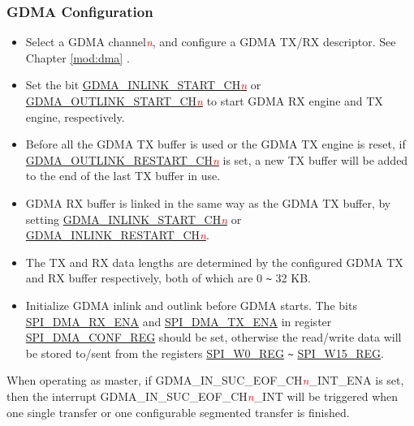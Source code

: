 \documentclass[main\_\_EN.tex]{subfiles}
\begin{document}
\subsubsection{GDMA Configuration}\label{para:gdma-config}


\begin{itemize}
    \item Select a GDMA channel\textcolor{red}{\it{n}}, and configure a GDMA TX/RX descriptor. See Chapter \ref{mod:dma} \textit{}.

    \item Set the bit \hyperref[fielddesc:GDMAINLINKSTARTCHN]{GDMA\_INLINK\_START\_CH\textcolor{red}{\it{n}}} or \hyperref[fielddesc:GDMAOUTLINKSTARTCHN]{GDMA\_OUTLINK\_START\_CH\textcolor{red}{\it{n}}} to start GDMA RX engine and TX engine, respectively.

    \item Before all the GDMA TX buffer is used or the GDMA TX engine is reset, if  \hyperref[fielddesc:GDMAOUTLINKRESTARTCHN]{GDMA\_OUTLINK\_RESTART\_CH\textcolor{red}{\it{n}}} is set, a new TX buffer will be added to the end of the last TX buffer in use.

    \item GDMA RX buffer is linked in the same way as the GDMA TX buffer, by setting \hyperref[fielddesc:GDMAINLINKSTARTCHN]{GDMA\_INLINK\_START\_CH\textcolor{red}{\it{n}}} or \hyperref[fielddesc:GDMAINLINKRESTARTCHN]{GDMA\_INLINK\_RESTART\_CH\textcolor{red}{\it{n}}}.

    \item The TX and RX data lengths are determined by the configured GDMA TX and RX buffer respectively, both of which are 0 \verb+~+ 32 KB.

    \item Initialize GDMA inlink and outlink before GDMA starts. The bits \hyperref[fielddesc:SPIDMARXENA]{SPI\_DMA\_RX\_ENA} and \hyperref[fielddesc:SPIDMATXENA]{SPI\_DMA\_TX\_ENA} in register \hyperref[regdesc:SPIDMACONFREG]{SPI\_DMA\_CONF\_REG} should be set, otherwise the read/write data will be stored to/sent from the registers \hyperref[regdesc:SPIW0REG]{SPI\_W0\_REG} \verb+~+ \hyperref[regdesc:SPIW0REG]{SPI\_W15\_REG}.

\end{itemize}

When operating as master, if GDMA\_IN\_SUC\_EOF\_CH\textcolor{red}{\it{n}}\_INT\_ENA is set, then the interrupt GDMA\_IN\_SUC\_EOF\_CH\textcolor{red}{\it{n}}\_INT will be triggered when one single transfer or one configurable segmented transfer is finished.
\end{document}
